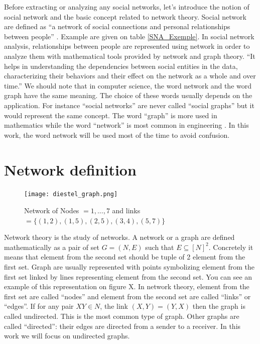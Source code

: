 \documentclass[a4paper, 12pt]{report}
\begin{document}
Before extracting or analyzing any social networks, let's introduce the notion of social network and the basic concept related to network theory.
Social network are defined as ``a network of social connections and personal relationships between people'' \citep{SNA_Overview}. Example are given on table \ref{SNA_Exemple}.
In social network analysis, relationships between people are represented using network in order to analyze them with mathematical tools provided by network 
and graph theory. ``It helps in understanding the
dependencies between social entities in the data, characterizing
their behaviors and their effect on the network as
a whole and over time.'' \citep{SNA_Overview}
We should note that in computer science, the word network and the word graph have the same meaning. The choice of these words usually depends on the application. For instance ``social networks'' are never called  ``social graphs'' 
but it would represent the same concept. The word ``graph'' is more used in mathematics while the word ``network'' is most common in engineering \citep{network_theory}. In this work, the word network will be used most of the time to avoid confusion.


\section{Network definition}
\begin{figure}
\centering
\texttt{[image: diestel\_graph.png]}
\caption{Network of Nodes $= 1,...,7$ and links $= \{(1, 2), (1, 5), (2, 5), (3, 4), (5, 7)\}$  \citep{diestel}}
\label{diestel graph}
\end{figure}

Network theory is the study of networks. A  network or a graph are defined mathematically as a pair of set $G = (N, E)$ such that $E  \subseteq [N ]^2$. Concretely it means that element from the second set should be tuple of 2 element from the first set.
Graph are usually represented with points symbolizing element from the first set linked by lines representing element from the second set. You can see an example of this representation on figure X. In network theory, element from the first set are called ``nodes'' and element from the second set are called ``links'' or ``edges''. If for any pair $XY \in N$,  the link $(X,Y) = (Y,X)$ then the graph is called undirected. This is the most common type of graph. Other graphs are called ``directed'': their edges are directed from a sender to a receiver. In this work we will focus on undirected graphs. \citep{diestel}\\
\end{document}
